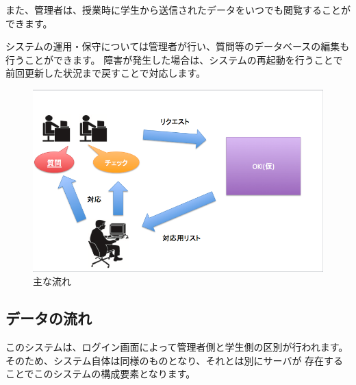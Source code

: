 \documentclass[a4j,titlepage]{ujarticle}
\begin{document}
また、管理者は、授業時に学生から送信されたデータをいつでも閲覧することができます。



システムの運用・保守については管理者が行い、質問等のデータベースの編集も行うことができます。
障害が発生した場合は、システムの再起動を行うことで前回更新した状況まで戻すことで対応します。 %
\begin{figure}[h]

\centering
   \includegraphics[width=13cm]{hito.png}
  \caption{主な流れ}
\end{figure}


\subsection{データの流れ}
このシステムは、ログイン画面によって管理者側と学生側の区別が行われます。そのため、システム自体は同様のものとなり、それとは別にサーバが %
存在することでこのシステムの構成要素となります。
\end{document}
